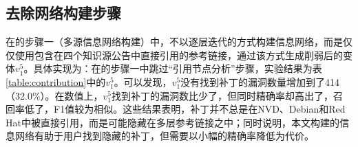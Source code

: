 \subsection{去除网络构建步骤}
在\tool 的步骤一（多源信息网络构建）中，不以逐层迭代的方式构建信息网络，而是仅仅使用包含在四个知识源公告中直接引用的参考链接，通过该方式生成削弱后的变体$v_1^5$。具体实现为：在\tool 的步骤一中跳过“引用节点分析”步骤，实验结果为表\ref{table:contribution}中的$v_1^5$。可以发现，$v_1^5$没有找到补丁的漏洞数量增加到了414（32.0\%）。在数值上，$v_1^5$找到补丁的漏洞数比\tool 少了，但同时精确率却高出了，召回率低了，F1值较为相似。这些结果表明，补丁并不总是在NVD、Debian和Red Hat中被直接引用，而是可能隐藏在多层参考链接之中；同时说明，本文构建的信息网络有助于用户找到隐藏的补丁，但需要以小幅的精确率降低为代价。


